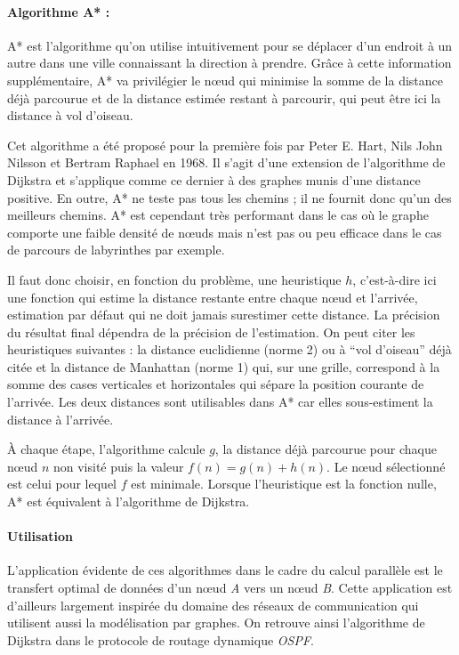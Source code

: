 \paragraph{Algorithme A* : }

A* est l'algorithme qu'on utilise intuitivement pour se déplacer d'un endroit à un autre dans une ville
connaissant la direction à prendre. Grâce à cette information supplémentaire, A* va privilégier le nœud qui minimise 
la somme de la distance déjà parcourue et de la distance estimée restant à parcourir, qui peut être ici la distance à vol d'oiseau.


Cet algorithme a été proposé pour la première fois 
par Peter E. Hart, Nils John Nilsson et Bertram Raphael
en 1968. Il s'agit d'une extension de l'algorithme de Dijkstra et s'applique comme ce dernier
à des graphes munis d'une distance positive. En outre, A* ne teste pas tous les chemins ; il ne fournit donc
qu'un des meilleurs chemins. A* est cependant très performant dans le cas où le graphe comporte une faible densité de nœuds 
mais n'est pas ou peu efficace dans le cas de parcours de labyrinthes par exemple.


Il faut donc choisir, en fonction du problème, une heuristique $h$, c'est-à-dire ici une fonction qui estime la distance 
restante entre chaque nœud et l'arrivée, estimation par défaut qui ne doit jamais surestimer cette distance. 
La précision du résultat final dépendra de la précision de l'estimation.
On peut citer les heuristiques suivantes : la distance euclidienne (norme 2) ou à ``vol d'oiseau'' déjà citée 
et la distance de Manhattan (norme 1) qui, sur une grille, correspond à la somme des cases verticales et horizontales
qui sépare la position courante de l'arrivée. Les deux distances sont utilisables dans A* car elles sous-estiment
la distance à l'arrivée.

À chaque étape, l'algorithme calcule $g$, la distance déjà parcourue pour chaque nœud $n$ non visité puis
la valeur $f(n) = g(n) + h(n)$. Le nœud sélectionné est celui pour lequel $f$ est minimale. Lorsque l'heuristique est la fonction nulle, A* est équivalent à l'algorithme de Dijkstra.



\paragraph{Utilisation} L'application évidente de ces algorithmes dans le cadre du calcul parallèle est le transfert optimal de données d'un nœud \textit{A} vers un nœud \textit{B}. Cette application est d'ailleurs largement inspirée du domaine des réseaux de communication qui utilisent aussi la modélisation par graphes. On retrouve ainsi l'algorithme de Dijkstra dans le protocole de routage dynamique \textit{OSPF}.

